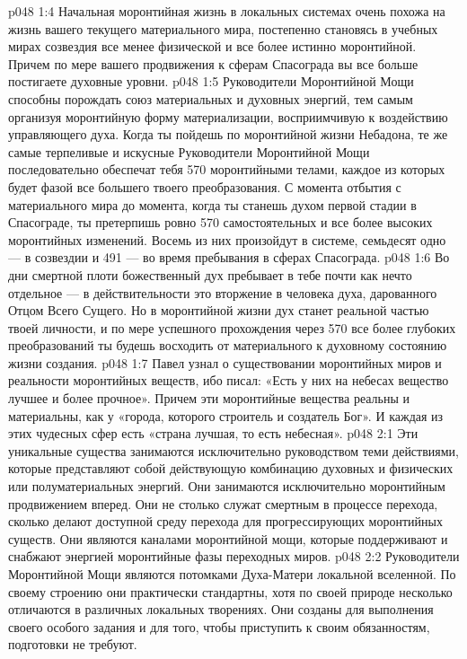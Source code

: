 \vs p048 1:4 \pc Начальная моронтийная жизнь в локальных системах очень похожа на жизнь вашего текущего материального мира, постепенно становясь в учебных мирах созвездия все менее физической и все более истинно моронтийной. Причем по мере вашего продвижения к сферам Спасограда вы все больше постигаете духовные уровни.
\vs p048 1:5 Руководители Моронтийной Мощи способны порождать союз материальных и духовных энергий, тем самым организуя моронтийную форму материализации, восприимчивую к воздействию управляющего духа. Когда ты пойдешь по моронтийной жизни Небадона, те же самые терпеливые и искусные Руководители Моронтийной Мощи последовательно обеспечат тебя 570 моронтийными телами, каждое из которых будет фазой все большего твоего преобразования. С момента отбытия с материального мира до момента, когда ты станешь духом первой стадии в Спасограде, ты претерпишь ровно 570 самостоятельных и все более высоких моронтийных изменений. Восемь из них произойдут в системе, семьдесят одно --- в созвездии и 491 --- во время пребывания в сферах Спасограда.
\vs p048 1:6 Во дни смертной плоти божественный дух пребывает в тебе почти как нечто отдельное --- в действительности это вторжение в человека духа, дарованного Отцом Всего Сущего. Но в моронтийной жизни дух станет реальной частью твоей личности, и по мере успешного прохождения через 570 все более глубоких преобразований ты будешь восходить от материального к духовному состоянию жизни создания.
\vs p048 1:7 \pc Павел узнал о существовании моронтийных миров и реальности моронтийных веществ, ибо писал: «Есть у них на небесах вещество лучшее и более прочное». Причем эти моронтийные вещества реальны и материальны, как у «города, которого строитель и создатель Бог». И каждая из этих чудесных сфер есть «страна лучшая, то есть небесная».
\vs p048 2:1 Эти уникальные существа занимаются исключительно руководством теми действиями, которые представляют собой действующую комбинацию духовных и физических или полуматериальных энергий. Они занимаются исключительно моронтийным продвижением вперед. Они не столько служат смертным в процессе перехода, сколько делают доступной среду перехода для прогрессирующих моронтийных существ. Они являются каналами моронтийной мощи, которые поддерживают и снабжают энергией моронтийные фазы переходных миров.
\vs p048 2:2 Руководители Моронтийной Мощи являются потомками Духа\hyp{}Матери локальной вселенной. По своему строению они практически стандартны, хотя по своей природе несколько отличаются в различных локальных творениях. Они созданы для выполнения своего особого задания и для того, чтобы приступить к своим обязанностям, подготовки не требуют.
